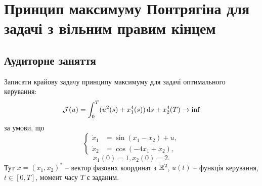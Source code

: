 \section{Принцип максимуму Понтрягіна для задачі з вільним правим кінцем}

\subsection{Аудиторне заняття}

\begin{problem}
    Записати крайову задачу принципу максимуму для задачі оптимального керування:
    \begin{equation*}
        \mathcal{J}(u) = \int_0^T (u^2(s) + x_1^4(s)) \mathop{}\!\mathrm{d} s + x_2^4(T) \to \inf
    \end{equation*}
    за умови, що
    \[ \left\{ \begin{aligned}
        \dot x_1 &= \sin(x_1 - x_2) + u, \\
        \dot x_2 &= \cos(-4x_1 + x_2),
    \end{aligned} \right. \]
    \begin{equation*}
        x_1(0) = 1, x_2(0) = 2.
    \end{equation*}
    Тут $x = (x_1, x_2)^*$ -- вектор фазових координат з $\mathbb{R}^2$, $u(t)$ -- функція керування, $t \in [0, T]$, момент часу $T$ є заданим.
\end{problem}

